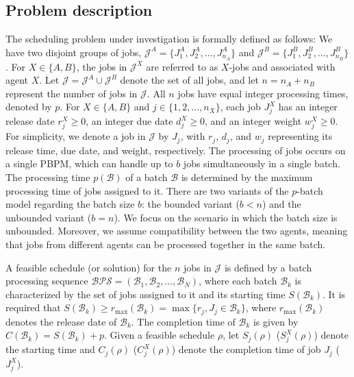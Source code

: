 \documentclass[12pt]{article}
\begin{document}
\begin{sloppypar}
\subsection{Problem description}
The scheduling problem under investigation is formally defined as follows:
We have two disjoint groups of jobs, ${\mathcal J}^{A}=\{J_1^{A}, J_2^{A}, \ldots, J_{n_A}^{A}\}$ and ${\mathcal J}^{B}=\{J_1^{B}, J_2^{B}, \ldots, J_{n_B}^{B}\}$. For  $X \in \{A, B\}$, the jobs in ${\mathcal J}^{X}$ are referred to as $X$-jobs and associated with agent $X$. Let $\mathcal{J}=\mathcal{J}^{A} \cup \mathcal{J}^{B}$ denote the set of all jobs, and let $n=n_A+n_B$ represent the number of jobs in $\mathcal{J}$. All $n$ jobs have equal integer processing times, denoted by $p$. For $X \in \{A, B\}$ and $j \in \{1, 2, \ldots, n_X\}$, each job $J_j^X$ has an integer release date $r_j^X \geq 0$, an integer due date $d_j^X \geq 0$, and an integer weight $w_j^X \geq 0$. For simplicity, we denote a job in $\mathcal{J}$ by $J_j$, with $r_j$, $d_j$, and $w_j$ representing its release time, due date, and weight, respectively. The processing of jobs occurs on a single PBPM, which can handle up to $b$ jobs simultaneously in a single batch. The processing time $p(\mathcal{B})$ of a batch $\mathcal{B}$ is determined by the maximum processing time of jobs assigned to it. There are two variants of the $p$-batch model regarding the batch size $b$: the bounded variant ($b < n$) and the unbounded variant ($b = n$). We focus on the scenario in which the batch size is unbounded. Moreover, we assume compatibility between the two agents, meaning that jobs from different agents can be processed together in the same batch.

A feasible schedule (or solution) for the $n$ jobs in $\mathcal{J}$ is defined by a batch processing sequence $\mathcal{BPS}=(\mathcal{B}_1, \mathcal{B}_2, \ldots, \mathcal{B}_N)$, where each batch $\mathcal{B}_k$ is characterized by the set of jobs assigned to it and its starting time $S(\mathcal{B}_k)$. It is required that $S(\mathcal{B}_k) \geq r_{\max}(\mathcal{B}_k)=\max \{r_j, J_j \in \mathcal{B}_k\}$, where $r_{\max}(\mathcal{B}_k)$ denotes the release date of $\mathcal{B}_k$. The completion time of $\mathcal{B}_k$ is given by $C(\mathcal{B}_k)=S(\mathcal{B}_k)+p$. Given a feasible schedule $\rho$, let $S_j(\rho)$ ($S_j^{X}(\rho)$) denote the starting time and $C_j(\rho)$ ($C_j^{X}(\rho)$) denote the completion time of  job $J_j$ ($J_j^{X}$).


\end{sloppypar}
\end{document}
